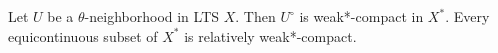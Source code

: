 Let $U$ be a $\theta$-neighborhood in LTS $X$. Then $U^\circ$ is weak*-compact in $X^*$. Every equicontinuous subset of $X^*$ is relatively weak*-compact.
